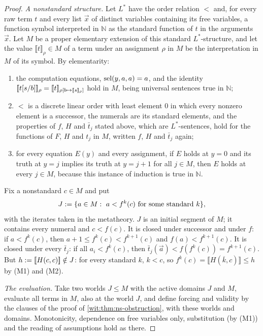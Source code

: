 \begin{proof}
\emph{A nonstandard structure.}  Let $L^{*}$ have the order relation $<$ and,
for every raw term $t$ and every list $\vec x$ of distinct variables
containing its free variables, a function symbol interpreted in $\mathbb{N}$ as
the standard function of $t$ in the arguments $\vec x$.  Let $M$ be a proper
elementary extension of this standard $L^{*}$-structure, and let the value
$\llbracket t\rrbracket_\rho\in M$ of a term under an assignment $\rho$ in $M$
be the interpretation in $M$ of its symbol.  By elementarity:
\begin{enumerate}[label=\textup{(M\arabic*)}]
\item the computation equations, $\operatorname{sel}(y,a,a)=a$, and the identity
 $[\![ t[s/b]]\!]_\rho=[\![ t]\!]_{\rho[b\mapsto[\![ s]\!]_\rho]}$
 hold in $M$, being universal sentences true in $\mathbb{N}$;
\item $<$ is a discrete linear order with least element $0$ in which every
 nonzero element is a successor, the numerals are its standard elements, and
 the properties of $f$, $H$ and $\bar t_j$ stated above, which are
 $L^{*}$-sentences, hold for the functions of $F$, $H$ and $t_j$ in $M$,
 written $f$, $H$ and $\bar t_j$ again;
\item for every equation $E(y)$ and every assignment, if $E$ holds at $y=0$
 and its truth at $y=j$ implies its truth at $y=j+1$ for all $j\in M$, then
 $E$ holds at every $j\in M$, because this instance of induction is true in
 $\mathbb{N}$.
\end{enumerate}
Fix a nonstandard $c\in M$ and put
\[
 J\mathrel{:=}\{a\in M:\ a<f^k(c)\text{ for some standard }k\},
\]
with the iterates taken in the metatheory.  $J$ is an initial segment of
$M$; it contains every numeral and $c<f(c)$.  It is closed under successor
and under $f$: if $a<f^k(c)$, then $a+1\le f^k(c)<f^{k+1}(c)$ and
$f(a)<f^{k+1}(c)$.  It is closed under every $\bar t_j$: if all $a_i<f^k(c)$,
then $\bar t_j(\vec a)<f(f^k(c))=f^{k+1}(c)$.  But
$h\mathrel{:=}[\![ H(c,c)]\!]\notin J$: for every standard $k$, $k<c$,
so $f^k(c)=\llbracket H(\overline k,c)\rrbracket\le h$ by (M1) and (M2).

\emph{The evaluation.}  Take two worlds $J\le M$ with the active domains $J$
and $M$, evaluate all terms in $M$, also at the world $J$, and define forcing
and validity by the clauses of the proof of \cref{wit:thm:ns-obstruction},
with these worlds and domains.  Monotonicity, dependence on free variables
only, substitution (by (M1)) and the reading of assumptions hold as there.


\end{proof}
